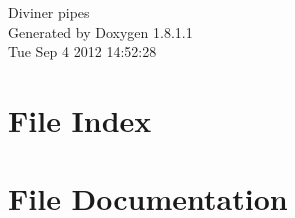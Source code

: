 \documentclass{book}
\begin{document}
\hypersetup{pageanchor=false,citecolor=blue}
\begin{titlepage}
\vspace*{7cm}
\begin{center}
{\Large Diviner pipes }\\
\vspace*{1cm}
{\large Generated by Doxygen 1.8.1.1}\\
\vspace*{0.5cm}
{\small Tue Sep 4 2012 14:52:28}\\
\end{center}
\end{titlepage}
\clearemptydoublepage
{}
\tableofcontents
\clearemptydoublepage
{}
\hypersetup{pageanchor=true,citecolor=blue}
\chapter{File Index}

\chapter{File Documentation}








































\printindex
\end{document}

